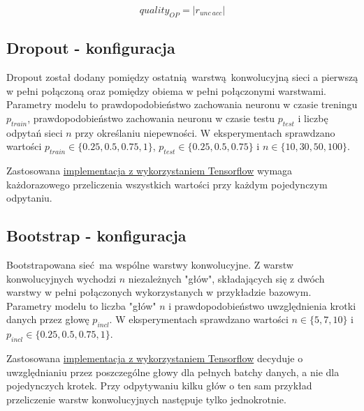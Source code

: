 \[ quality_{OP} = |r_{unc\ acc}|\]

\subsection{Dropout - konfiguracja}
Dropout został dodany pomiędzy ostatnią warstwą konwolucyjną sieci a pierwszą w pełni połączoną oraz pomiędzy obiema w pełni połączonymi warstwami.
Parametry modelu to prawdopodobieństwo zachowania neuronu w czasie treningu $p_{train}$, prawdopodobieństwo zachowania neuronu w czasie testu $p_{test}$ i liczbę odpytań sieci $n$ przy określaniu niepewności. W eksperymentach sprawdzano wartości $p_{train} \in \{0.25, 0.5, 0.75, 1\}$, $p_{test} \in \{0.25, 0.5, 0.75\}$ i $n \in \{10, 30, 50, 100\}$.

Zastosowana \href{https://link.do.pliku}{implementacja z wykorzystaniem Tensorflow} wymaga każdorazowego przeliczenia wszystkich wartości przy każdym pojedynczym odpytaniu.

\subsection{Bootstrap - konfiguracja}
Bootstrapowana sieć ma wspólne warstwy konwolucyjne. Z warstw konwolucyjnych wychodzi $n$ niezależnych "głów", składających się z dwóch warstwy w pełni połączonych wykorzystanych w przykładzie bazowym. Parametry modelu to liczba "głów" $n$ i prawdopodobieństwo uwzględnienia krotki danych przez głowę $p_{incl}$.  W eksperymentach sprawdzano wartości $n \in  \{5,7,10\}$ i $p_{incl}\in\{0.25, 0.5, 0.75, 1\}$.

Zastosowana \href{https://link.do.pliku}{implementacja z wykorzystaniem Tensorflow} decyduje o uwzględnianiu przez poszczególne głowy dla pełnych batchy danych, a nie dla pojedynczych krotek. Przy odpytywaniu kilku głów o ten sam przykład przeliczenie warstw konwolucyjnych następuje tylko jednokrotnie.


